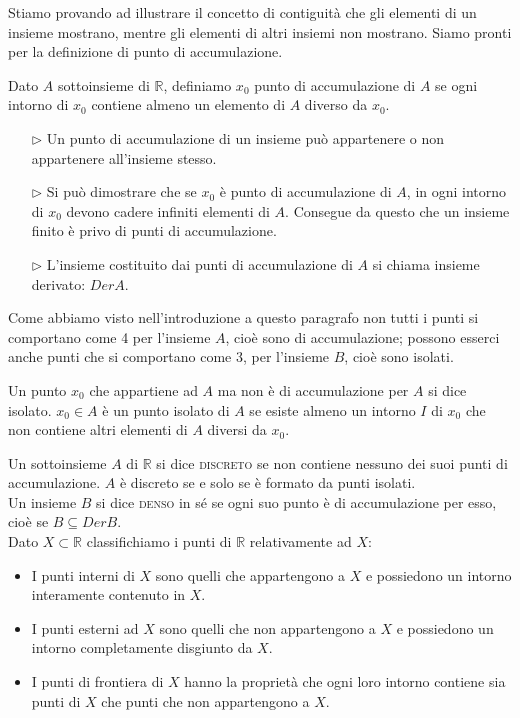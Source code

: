 Stiamo provando ad illustrare il concetto di contiguità che gli elementi di 
un insieme mostrano, mentre gli elementi di altri insiemi non mostrano. Siamo 
pronti per la definizione di punto di accumulazione.\\

\begin{definizione}
  Dato \(A\) sottoinsieme di \(\mathbb{R}\), definiamo \(x_0\) punto di 
accumulazione di \(A\) se ogni intorno di \(x_0\) contiene almeno un elemento di 
\(A\) diverso da \(x_0\).
\begin{itemize}
  \item[\(\rhd\)] Un punto di accumulazione di un insieme può appartenere 
o non appartenere all'insieme stesso.
  \item[\(\rhd\)]   Si può dimostrare che se \(x_0\) è punto di 
accumulazione di \(A\), in ogni intorno di \(x_0\) devono cadere infiniti 
elementi di \(A\). Consegue da questo che un insieme finito è privo di punti di 
accumulazione.
  \item[\(\rhd\)] L'insieme costituito dai punti di accumulazione di \(A\) 
si chiama insieme derivato: \(Der A\).
\end{itemize}
\end{definizione}

Come abbiamo visto nell'introduzione a questo paragrafo non tutti i punti si 
comportano come 4 per l'insieme \(A\), cioè sono di accumulazione; possono 
esserci anche punti che si comportano come 3, per l'insieme \(B\), cioè sono 
isolati.\\

\begin{definizione}
  Un punto \(x_0\) che appartiene ad \(A\) ma non è di accumulazione per \(A\) 
si dice isolato. \(x_0\in A\) è un punto isolato di \(A\) se esiste almeno un 
intorno \(I\) di \(x_0\) che non contiene altri elementi di \(A\) diversi da 
\(x_0\).\\
\end{definizione}

Un sottoinsieme \(A\) di \(\mathbb{R}\) si dice \textsc{discreto} se non contiene 
nessuno dei suoi punti di accumulazione. \(A\) è discreto se e solo se è 
formato da punti isolati.\\
Un insieme \(B\) si dice \textsc{denso} in sé se ogni suo punto è di 
accumulazione per esso, cioè se \(B\subseteq Der B\).\\

Dato \(X\subset \mathbb{R}\) classifichiamo i punti di \(\mathbb{R}\) 
relativamente ad \(X\):
\begin{itemize}
  \item I punti interni di \(X\) sono quelli che appartengono a \(X\) e 
possiedono un intorno interamente contenuto in \(X\).
  \item   I punti esterni ad \(X\) sono quelli che non appartengono a \(X\) 
e possiedono un intorno completamente disgiunto da \(X\).
  \item   I punti di frontiera di \(X\) hanno la proprietà che ogni loro 
intorno contiene sia punti di \(X\) che punti che non appartengono a \(X\).
\end{itemize}

